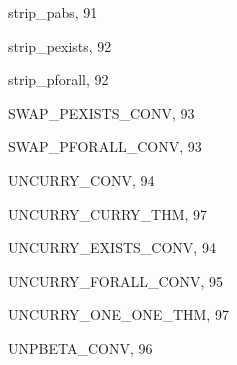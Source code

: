 \begin{theindex}
  \indexspace

  \item {\ptt strip\_pabs}, 91
  \item {\ptt strip\_pexists}, 92
  \item {\ptt strip\_pforall}, 92
  \item {\ptt SWAP\_PEXISTS\_CONV}, 93
  \item {\ptt SWAP\_PFORALL\_CONV}, 93

  \indexspace

  \item {\ptt UNCURRY\_CONV}, 94
  \item {\ptt UNCURRY\_CURRY\_THM}, 97
  \item {\ptt UNCURRY\_EXISTS\_CONV}, 94
  \item {\ptt UNCURRY\_FORALL\_CONV}, 95
  \item {\ptt UNCURRY\_ONE\_ONE\_THM}, 97
  \item {\ptt UNPBETA\_CONV}, 96

\end{theindex}
